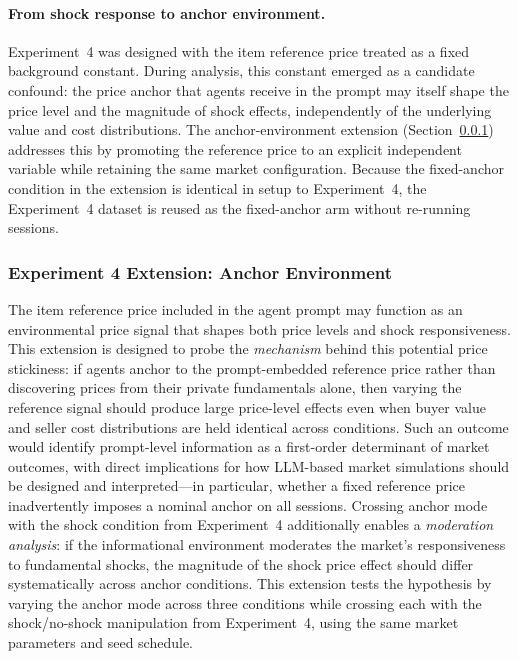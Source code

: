 \paragraph{From shock response to anchor environment.}
Experiment~4 was designed with the item reference price treated as a fixed background constant.  During analysis, this constant emerged as a candidate confound: the price anchor that agents receive in the prompt may itself shape the price level and the magnitude of shock effects, independently of the underlying value and cost distributions.  The anchor-environment extension (Section~\ref{sec:exp-anchor}) addresses this by promoting the reference price to an explicit independent variable while retaining the same market configuration.  Because the fixed-anchor condition in the extension is identical in setup to Experiment~4, the Experiment~4 dataset is reused as the fixed-anchor arm without re-running sessions.

\subsubsection{Experiment 4 Extension: Anchor Environment}
\label{sec:exp-anchor}

The item reference price included in the agent prompt may function as an environmental price signal that shapes both price levels and shock responsiveness.  This extension is designed to probe the \emph{mechanism} behind this potential price stickiness: if agents anchor to the prompt-embedded reference price rather than discovering prices from their private fundamentals alone, then varying the reference signal should produce large price-level effects even when buyer value and seller cost distributions are held identical across conditions.  Such an outcome would identify prompt-level information as a first-order determinant of market outcomes, with direct implications for how LLM-based market simulations should be designed and interpreted---in particular, whether a fixed reference price inadvertently imposes a nominal anchor on all sessions.  Crossing anchor mode with the shock condition from Experiment~4 additionally enables a \emph{moderation analysis}: if the informational environment moderates the market's responsiveness to fundamental shocks, the magnitude of the shock price effect should differ systematically across anchor conditions.  This extension tests the hypothesis by varying the anchor mode across three conditions while crossing each with the shock/no-shock manipulation from Experiment~4, using the same market parameters and seed schedule.

